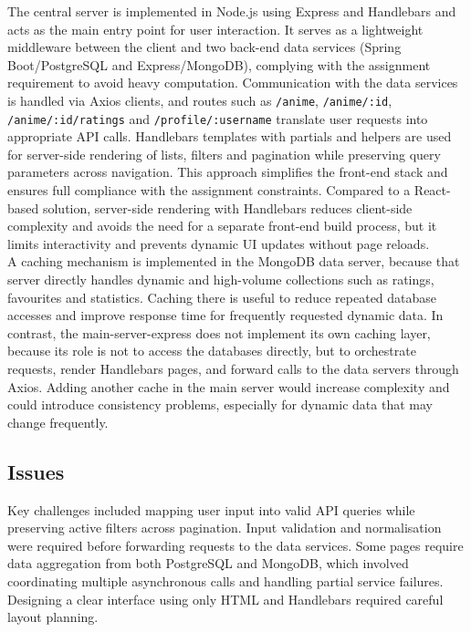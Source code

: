 \documentclass[12pt,a4paper]{article}
\begin{document}
The central server is implemented in Node.js using Express and Handlebars and acts as the main entry point for user interaction. It serves as a lightweight middleware between the client and two back-end data services (Spring Boot/PostgreSQL and Express/MongoDB), complying with the assignment requirement to avoid heavy computation. Communication with the data services is handled via Axios clients, and routes such as \texttt{/anime}, \texttt{/anime/:id}, \texttt{/anime/:id/ratings} and \texttt{/profile/:username} translate user requests into appropriate API calls. Handlebars templates with partials and helpers are used for server-side rendering of lists, filters and pagination while preserving query parameters across navigation. This approach simplifies the front-end stack and ensures full compliance with the assignment constraints. Compared to a React-based solution, server-side rendering with Handlebars reduces client-side complexity and avoids the need for a separate front-end build process, but it limits interactivity and prevents dynamic UI updates without page reloads.\\
A caching mechanism is implemented in the MongoDB data server, because that server directly handles dynamic and high-volume collections such as ratings, favourites and statistics. Caching there is useful to reduce repeated database accesses and improve response time for frequently requested dynamic data.
In contrast, the main-server-express does not implement its own caching layer, because its role is not to access the databases directly, but to orchestrate requests, render Handlebars pages, and forward calls to the data servers through Axios. Adding another cache in the main server would increase complexity and could introduce consistency problems, especially for dynamic data that may change frequently.

\subsection{Issues}

Key challenges included mapping user input into valid API queries while preserving active filters across pagination. Input validation and normalisation were required before forwarding requests to the data services. Some pages require data aggregation from both PostgreSQL and MongoDB, which involved coordinating multiple asynchronous calls and handling partial service failures. Designing a clear interface using only HTML and Handlebars required careful layout planning.
\end{document}
